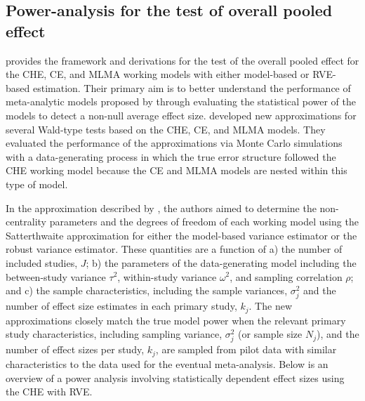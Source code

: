 \subsection{Power-analysis for the test of overall pooled effect}


\textcite{vembye2023} provides the framework and derivations for the test of the overall pooled effect for the CHE, CE, and MLMA working models with either model-based or RVE-based estimation. Their primary aim is to better understand the performance of meta-analytic models proposed by \textcite{pustejovsky2022} through evaluating the statistical power of the models to detect a non-null average effect size. \textcite{vembye2023} developed new approximations for several Wald-type tests based on the CHE, CE, and MLMA models. They evaluated the performance of the approximations via Monte Carlo simulations with a data-generating process in which the true error structure followed the CHE working model because the CE and MLMA models are nested within this type of model. 

In the approximation described by \textcite{vembye2023}, the authors aimed to determine the non-centrality parameters and the degrees of freedom of each working model using the Satterthwaite approximation for either the model-based variance estimator or the robust variance estimator. These quantities are a function of a) the number of included studies, $J$; b) the parameters of the data-generating model including the between-study variance $\tau^2$, within-study variance $\omega^2$, and sampling correlation $\rho$; and c) the sample characteristics, including the sample variances, $\sigma^2_j$ and the number of effect size estimates in each primary study, $k_j$. The new approximations closely match the true model power when the relevant primary study characteristics, including sampling variance, $\sigma_j^2$ (or sample size $N_j$), and the number of effect sizes per study, $k_j$, are sampled from pilot data with similar characteristics to the data used for the eventual meta-analysis. Below is an overview of a power analysis involving statistically dependent effect sizes using the CHE with RVE.

